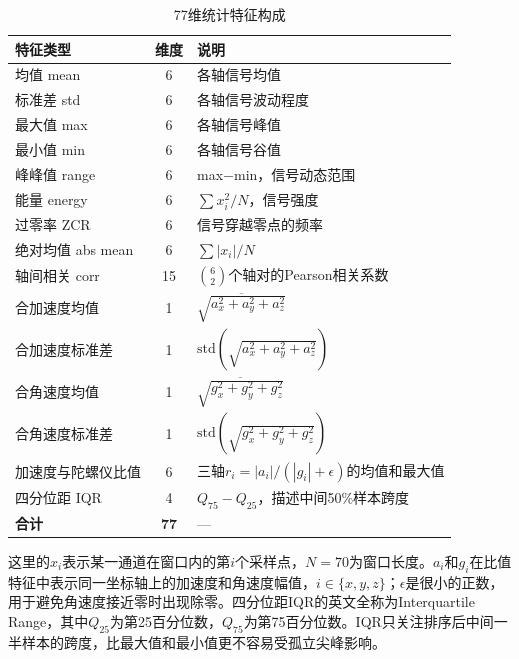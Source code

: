 \documentclass[lettersize,journal]{IEEEtran}
\begin{document}
\begin{table}[htbp]
    \centering
    \caption{77维统计特征构成}
    \label{tab:stat_features}
    \begin{tabular}{lcp{4.5cm}}
        \toprule
        \textbf{特征类型} & \textbf{维度} & \textbf{说明} \\
        \midrule
        均值 mean        & 6   & 各轴信号均值 \\
        标准差 std       & 6   & 各轴信号波动程度 \\
        最大值 max       & 6   & 各轴信号峰值 \\
        最小值 min       & 6   & 各轴信号谷值 \\
        峰峰值 range     & 6   & max$-$min，信号动态范围 \\
        能量 energy      & 6   & $\sum x_i^2 / N$，信号强度 \\
        过零率 ZCR       & 6   & 信号穿越零点的频率 \\
        绝对均值 abs mean & 6   & $\sum |x_i| / N$ \\
        轴间相关 corr    & 15  & $\binom{6}{2}$个轴对的Pearson相关系数 \\
        合加速度均值        & 1   & $\overline{\sqrt{a_x^2 + a_y^2 + a_z^2}}$ \\
        合加速度标准差      & 1   & $\mathrm{std}(\sqrt{a_x^2 + a_y^2 + a_z^2})$ \\
        合角速度均值        & 1   & $\overline{\sqrt{g_x^2 + g_y^2 + g_z^2}}$ \\
        合角速度标准差      & 1   & $\mathrm{std}(\sqrt{g_x^2 + g_y^2 + g_z^2})$ \\
        加速度与陀螺仪比值  & 6   & 三轴$r_i=|a_i|/(|g_i|+\epsilon)$的均值和最大值 \\
        四分位距 IQR     & 4   & $Q_{75}-Q_{25}$，描述中间50\%样本跨度 \\
        \midrule
        \textbf{合计}       & \textbf{77} & — \\
        \bottomrule
    \end{tabular}
\end{table}


这里的$x_i$表示某一通道在窗口内的第$i$个采样点，$N=70$为窗口长度。$a_i$和$g_i$在比值特征中表示同一坐标轴上的加速度和角速度幅值，$i\in\{x,y,z\}$；$\epsilon$是很小的正数，用于避免角速度接近零时出现除零。四分位距IQR的英文全称为Interquartile Range，其中$Q_{25}$为第25百分位数，$Q_{75}$为第75百分位数。IQR只关注排序后中间一半样本的跨度，比最大值和最小值更不容易受孤立尖峰影响。
\end{document}
